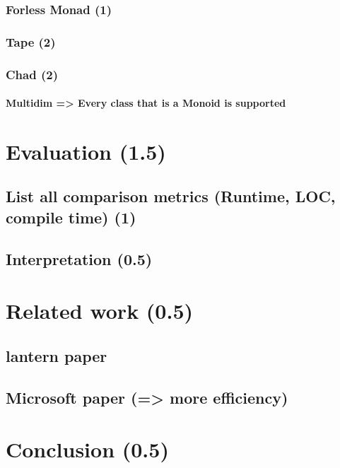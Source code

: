 		\subsection{Forless Monad (1)}
		\subsection{Tape (2)}
		\subsection{Chad (2)}
			\subsubsection{Multidim => Every class that is a Monoid is supported}

\chapter{Evaluation (1.5)}
	\section{List all comparison metrics (Runtime, LOC, compile time) (1)}
	\section{Interpretation (0.5)}

\chapter{Related work (0.5)}
	\section{lantern paper}
	\section{Microsoft paper (=> more efficiency)}

\chapter{Conclusion (0.5)}


